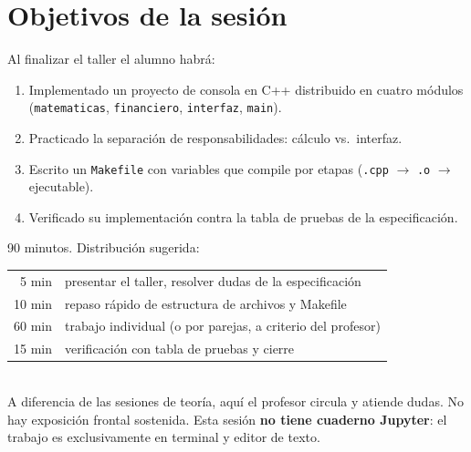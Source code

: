 \documentclass[12pt, oneside]{article}
\begin{document}

\tableofcontents
\newpage

\section{Objetivos de la sesión}

Al finalizar el taller el alumno habrá:

\begin{enumerate}
  \item Implementado un proyecto de consola en C++ distribuido en cuatro
        módulos (\texttt{matematicas}, \texttt{financiero},
        \texttt{interfaz}, \texttt{main}).
  \item Practicado la separación de responsabilidades: cálculo vs.\ interfaz.
  \item Escrito un \texttt{Makefile} con variables que compile por etapas
        (\texttt{.cpp} $\to$ \texttt{.o} $\to$ ejecutable).
  \item Verificado su implementación contra la tabla de pruebas de la
        especificación.
\end{enumerate}

\begin{notaprofesor}
  90 minutos.  Distribución sugerida:\\[2pt]
  \begin{tabular}{rl}
    5 min  & presentar el taller, resolver dudas de la especificación \\
    10 min & repaso rápido de estructura de archivos y Makefile \\
    60 min & trabajo individual (o por parejas, a criterio del profesor) \\
    15 min & verificación con tabla de pruebas y cierre \\
  \end{tabular}\\[4pt]
  A diferencia de las sesiones de teoría, aquí el profesor circula y
  atiende dudas.  No hay exposición frontal sostenida.
  Esta sesión \textbf{no tiene cuaderno Jupyter}: el trabajo es
  exclusivamente en terminal y editor de texto.
\end{notaprofesor}

\end{document}
